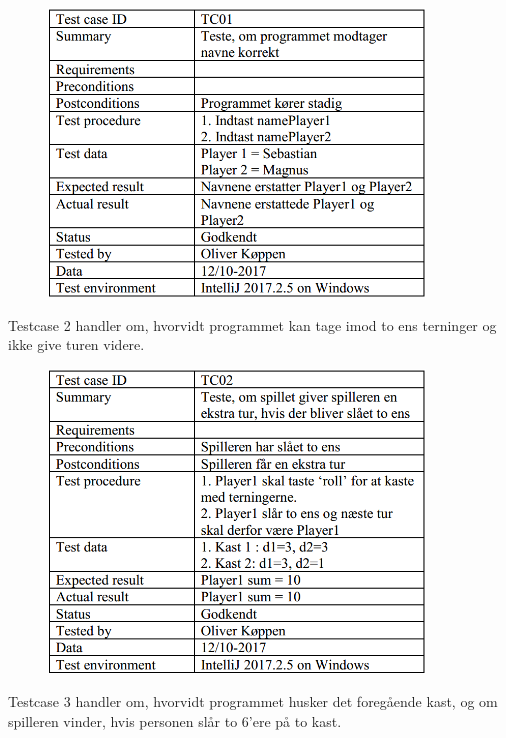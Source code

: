 \begin{figure}[h]
    \begin{center}
        \includegraphics[width=10cm]{graphics/TC01}
    \end{center}
\end{figure}

\noindent
Testcase 2 handler om, hvorvidt programmet kan tage imod to ens terninger og ikke give turen videre.

\begin{figure}[h]
    \begin{center}
        \includegraphics[width=10cm]{graphics/TC02}
    \end{center}
\end{figure}

\noindent
Testcase 3 handler om, hvorvidt programmet husker det foregående kast, og om spilleren vinder, hvis personen slår to 6'ere på to kast.

